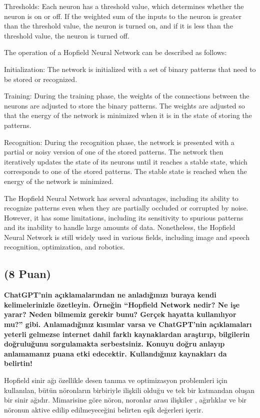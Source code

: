\documentclass[11pt]{article}
\begin{document}
Thresholds: Each neuron has a threshold value, which determines whether the neuron is on or off. If the weighted sum of the inputs to the neuron is greater than the threshold value, the neuron is turned on, and if it is less than the threshold value, the neuron is turned off.

The operation of a Hopfield Neural Network can be described as follows:

Initialization: The network is initialized with a set of binary patterns that need to be stored or recognized.

Training: During the training phase, the weights of the connections between the neurons are adjusted to store the binary patterns. The weights are adjusted so that the energy of the network is minimized when it is in the state of storing the patterns.

Recognition: During the recognition phase, the network is presented with a partial or noisy version of one of the stored patterns. The network then iteratively updates the state of its neurons until it reaches a stable state, which corresponds to one of the stored patterns. The stable state is reached when the energy of the network is minimized.

The Hopfield Neural Network has several advantages, including its ability to recognize patterns even when they are partially occluded or corrupted by noise. However, it has some limitations, including its sensitivity to spurious patterns and its inability to handle large amounts of data. Nonetheless, the Hopfield Neural Network is still widely used in various fields, including image and speech recognition, optimization, and robotics.

\subsection{(8 Puan)} \textbf{ChatGPT’nin açıklamalarından ne anladığınızı buraya kendi kelimelerinizle özetleyin. Örneğin ``Hopfield Network nedir? Ne işe yarar? Neden bilmemiz gerekir bunu? Gerçek hayatta kullanılıyor mu?'' gibi. Anlamadığınız kısımlar varsa ve ChatGPT’nin açıklamaları yeterli gelmezse internet dahil farklı kaynaklardan araştırıp, bilgilerin doğruluğunu sorgulamakta serbestsiniz. Konuyu doğru anlayıp anlamamanız puana etki edecektir. Kullandığınız kaynakları da belirtin!}

Hopfield sinir ağı özellikle desen tanıma ve optimizasyon problemleri için kullanılan, bütün nöronların birbiriyle ilişkili olduğu ve tek bir katmandan oluşan bir sinir ağıdır. Mimarisine göre nöron, noronlar arası ilişkiler , ağırlıklar ve bir nöronun aktive edilip edilmeyeceğini belirten eşik değerleri içerir.
\end{document}
